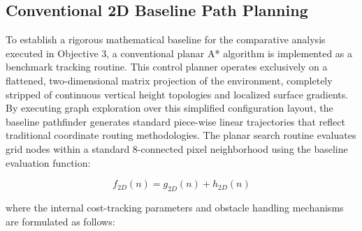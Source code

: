 \subsection{Conventional 2D Baseline Path Planning}

To establish a rigorous mathematical baseline for the comparative analysis executed in Objective 3,
a conventional planar A* algorithm is implemented as a benchmark tracking routine. This control
planner operates exclusively on a flattened, two-dimensional matrix projection of the environment,
completely stripped of continuous vertical height topologies and localized surface gradients. By
executing graph exploration over this simplified configuration layout, the baseline pathfinder
generates standard piece-wise linear trajectories that reflect traditional coordinate routing
methodologies. The planar search routine evaluates grid nodes within a standard 8-connected pixel
neighborhood using the baseline evaluation function:

\begin{equation}
    f_{2D}(n) = g_{2D}(n) + h_{2D}(n)
\end{equation}

\noindent where the internal cost-tracking parameters and obstacle handling mechanisms are formulated as follows:

